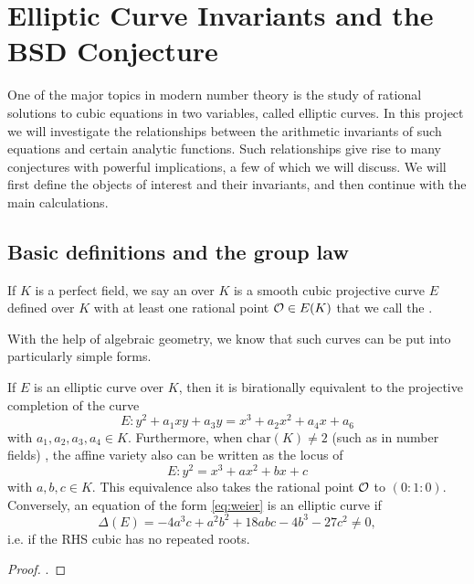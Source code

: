 \documentclass[12pt, a4paper]{amsart}
\begin{document}
\section{Elliptic Curve Invariants and the BSD Conjecture}

One of the major topics in modern number theory is the study of rational
solutions to cubic equations in two variables, called elliptic curves.
In this project we will
investigate the relationships between the arithmetic invariants of such
equations and certain analytic functions. Such relationships give rise to
many conjectures with powerful implications, a few of which we will discuss.
We will first define the objects of interest and their invariants, and then
continue with the main calculations.

\subsection{Basic definitions and the group law}

\begin{defn}
  If $K$ is a perfect field,
  we say an  over $K$ is a smooth cubic projective
  curve $E$ defined over $K$ with at least one rational point ${\mathcal O} \in E(K)$
  that we call the .
\end{defn}
With the help of algebraic geometry, we know that such curves can be put
into particularly simple forms.

\begin{prop}
  If $E$ is an elliptic curve over $K$, then it is birationally equivalent
  to the projective completion of the curve
  \begin{equation} \label{eq:weier2}
    E: y^2 + a_1xy + a_3y = x^3 + a_2x^2 + a_4x + a_6
  \end{equation}
  with $a_1, a_2, a_3, a_4 \in K.$
  Furthermore, when $\text{char}(K) \neq 2$ (such as in number fields)
  , the affine variety also can be written as the locus of
  \begin{equation} \label{eq:weier}
    E: y^2 = x^3 + ax^2 + bx + c
  \end{equation}
  with $a, b, c\in K$. This equivalence also takes the rational point ${\mathcal O}$ to
  $(0 : 1 : 0)$.
  Conversely, an equation of the form \ref{eq:weier} is an elliptic curve if
  \[\Delta(E) = -4a^3c + a^2b^2 + 18abc - 4b^3 - 27c^2 \neq 0,\]
  i.e. if the RHS cubic has no repeated roots.
\end{prop}

\begin{proof}
  \cite[See][Chapter III, pages 42-43]{arithmetic}.
\end{proof}
\end{document}
